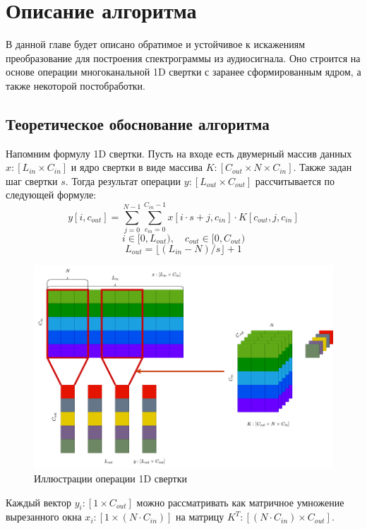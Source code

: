 \chapter{Описание алгоритма}
\label{cha:ch_2}

В данной главе будет описано обратимое и устойчивое к искажениям преобразование для построения спектрограммы из аудиосигнала.
Оно строится на основе операции многоканальной 1D свертки с заранее сформированным ядром, а также некоторой постобработки.

\section{Теоретическое обоснование алгоритма}
Напомним формулу 1D свертки. Пусть на входе есть двумерный массив данных $x: [L_{in} \times  C_{in}]$ 
и ядро свертки в виде массива $K: [C_{out} \times N \times C_{in}]$. Также задан шаг свертки $s$.
Тогда результат операции $y: [L_{out} \times C_{out}]$ рассчитывается по следующей формуле:
\begin{equation}
	y[i, c_{out}] = \sum_{j=0}^{N-1} \sum_{c_{in}=0}^{C_{in}-1} x[i \cdot s + j, c_{in}] \cdot K[c_{out}, j, c_{in}]
\end{equation}
\[i \in [0, L_{out}), \quad c_{out} \in [0, C_{out})\]
\[L_{out} = \lfloor(L_{in} - N) / s\rfloor + 1\]

\begin{figure}
  \centering
  \includegraphics[width=0.9\linewidth]{figures/conv1d_drawio}
  \caption{Иллюстрации операции 1D свертки}
  \label{fig:conv1d_drawio}
\end{figure}

Каждый вектор $y_i: [1 \times C_{out}]$ можно рассматривать как матричное умножение вырезанного окна $x_i: [1 \times (N \cdot C_{in})]$ на матрицу $K^T: [(N \cdot C_{in}) \times C_{out}]$.

